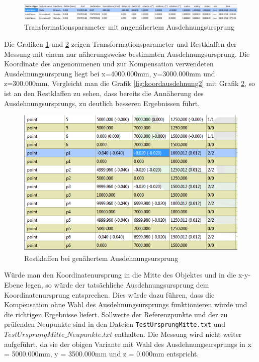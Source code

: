\begin{figure}[h]
\label{fig:trafoparamausdehnung2ausdursprnahe}
\centering
	\includegraphics[scale=1.5]{bilder/Testmessung/ursprungecke/trafoParamausdehnung2ausdursprnahe}
	\caption{Transformationsparameter mit angenähertem Ausdehnungsursprung}
\end{figure}

Die Grafiken \ref{fig:trafoparamausdehnung2ausdursprnahe} und \ref{fig:koordausdehnung2ausdursprnahe} zeigen Transformationsparameter und Restklaffen der Messung mit einem nur näherungsweise bestimmten Ausdehnungsursprung. Die Koordinate des angenommenen und zur Kompensation verwendeten Ausdehnungsursprung liegt bei x=4000.000mm, y=3000.000mm und z=300.000mm. Vergleicht man die Grafik \ref{fig:koordausdehnung2} mit Grafik \ref{fig:koordausdehnung2ausdursprnahe}, so ist an den Restklaffen zu sehen, dass bereits die Annäherung des Ausdehnungsursprungs, zu deutlich besseren Ergebnissen führt. 

\begin{figure}[h]
\label{fig:koordausdehnung2ausdursprnahe}
\centering
	\includegraphics[scale=2.0]{bilder/Testmessung/ursprungecke/koordsausdehnung2ausdursprnahe}
	\caption{Restklaffen bei genähertem Ausdehnungsursprung}
\end{figure}

Würde man den Koordinatenursprung in die Mitte des Objektes und in die x-y- Ebene legen, so würde der tatsächliche Ausdehnungsursprung dem Koordinatenursprung entsprechen. Dies würde dazu führen, dass die Kompensation ohne Wahl des Ausdehnungsursprungs funktionieren würde und die richtigen Ergebnisse liefert. Sollwerte der Referenzpunkte und der zu prüfenden Neupunkte sind in den Dateien \texttt{TestUrsprungMitte.txt} und \texttt{$TestUrsprungMitte\_ Neupunkte.txt$} enthalten. Die Messung wird nicht weiter aufgeführt, da sie der obigen Variante mit Wahl des Ausdehnungsursprungs in x = 5000.000mm, y = 3500.000mm und z = 0.000mm entspricht.

